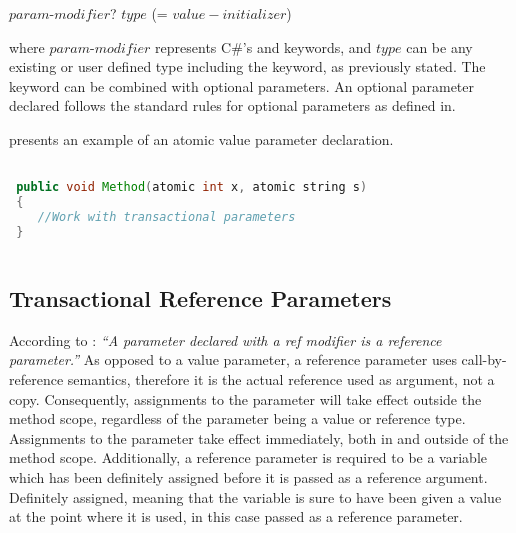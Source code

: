  $param$-$modifier$? $type$  (= $value-initializer$)

where $param$-$modifier$ represents C\#'s  and  keywords, and $type$ can be any existing or user defined type including the  keyword, as previously stated. The  keyword can be combined with optional parameters. An optional parameter declared  follows the standard rules for optional parameters as defined in\cite[p. 46-47]{sestoft2011c}.

 presents an example of an atomic value parameter declaration.

\begin{lstlisting}[label=lst:design_value_parameter,
 caption={Transactional Value Parameter},
 language=Java, 
 showspaces=false,
 showtabs=false,
 breaklines=true,
 showstringspaces=false,
 breakatwhitespace=true,
 commentstyle=\color{greencomments},
 keywordstyle=\color{bluekeywords},
 stringstyle=\color{redstrings},
 morekeywords={atomic, retry, orElse, var, get, set, string}]  % Start your code-block

 public void Method(atomic int x, atomic string s)
 {
 	//Work with transactional parameters
 }
  
\end{lstlisting}

\subsection{Transactional Reference Parameters}
\label{subsec:stm_desgin_ref_parameters}
According to \cite[p. 97]{csharp2013specificaiton}: \textit{``A parameter declared with a ref modifier is a reference parameter.''} As opposed to a value parameter, a reference parameter uses call-by-reference semantics, therefore it is the actual reference used as argument, not a copy. Consequently, assignments to the parameter will take effect outside the method scope, regardless of the parameter being a value or reference type. Assignments to the parameter take effect immediately, both in and outside of the method scope\cite[p. 42]{sestoft2011c}. Additionally, a reference parameter is required to be a variable which has been definitely assigned before it is passed as a reference argument\cite[p. 97]{csharp2013specificaiton}. Definitely assigned, meaning that the variable is sure to have been given a value at the point where it is used\cite[p. 96]{csharp2013specificaiton}, in this case passed as a reference parameter.

